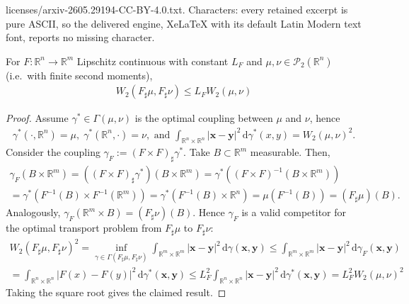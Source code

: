 \documentclass[10pt,a4paper]{amsart}
\newcommand{\bR}{\mathbb{R}}
\newcommand{\rd}{\mathrm{d}}
\newcommand{\x}{\bm{x}}
\newcommand{\y}{\bm{y}}
\begin{document}
licenses/arxiv-2605.29194-CC-BY-4.0.txt. Characters: every retained excerpt is pure ASCII, so the delivered engine, XeLaTeX with its default Latin Modern text font, reports no missing character.
\begin{lemma}
  \label{lemma:appdx:lipschitzW2}
  For $F: \bR^n \to \bR^m$ Lipschitz continuous with constant $L_F$ and $\mu, \nu \in \mathcal P_2(\bR^n)$ (i.e.\ with finite second moments),
  \begin{align}
    W_2(F _\sharp \mu, F _\sharp \nu) \leq L_F W_2(\mu, \nu)
  \end{align}
\end{lemma}

\begin{proof}
  Assume $\gamma^* \in \Gamma(\mu, \nu)$ is the optimal coupling between $\mu$ and $\nu$, hence
  \begin{align}
    \gamma^*(\cdot, \bR^n) = \mu, \; \gamma^*(\bR^n, \cdot) = \nu, \text{ and } \int_{\bR^n \times \bR^n} |\x - \y|^2 \, \rd \gamma^*(x, y) = W_2(\mu, \nu)^2.
  \end{align}
  Consider the coupling $\gamma_F := (F \times F) _\sharp \gamma^*$. Take $B \subset \bR^m$ measurable. Then,
  \begin{multline}
    \gamma_F(B \times \bR^m) = ((F \times F) _\sharp \gamma^*)(B \times \bR^m) = \gamma^*( (F \times F)^{-1}(B \times \bR^m) ) \\ = \gamma^*( F^{-1}(B) \times F^{-1}(\bR^m)) = \gamma^* ( F^{-1}(B) \times \bR^n ) = \mu(F^{-1}(B)) = (F _\sharp \mu)(B).
  \end{multline}
  Analogously, $\gamma_F(\bR^m \times B) = (F _\sharp \nu)(B)$. Hence $\gamma_F$ is a valid competitor for the optimal transport problem from $F _\sharp \mu$ to $F _\sharp \nu$:
  \begin{multline}
    W_2(F _\sharp \mu, F _\sharp \nu)^2 = \inf_{\gamma \in \Gamma(F _\sharp \mu, F _\sharp \nu)} \int_{\bR^m \times \bR^m} |\x - \y|^2 \, \rd \gamma(\x, \y)
    \leq \int_{\bR^m \times \bR^m} |\x - \y|^2 \, \rd \gamma_F(\x, \y) \\
    = \int_{\bR^n \times \bR^n} |F(x) - F(y)|^2 \, \rd \gamma^*(\x, \y)
    \leq L_F^2 \int_{\bR^n \times \bR^n} |\x - \y|^2 \, \rd \gamma^*(\x, \y)
    = L_F^2 W_2(\mu, \nu)^2
  \end{multline}
  Taking the square root gives the claimed result.
\end{proof}
\end{document}
